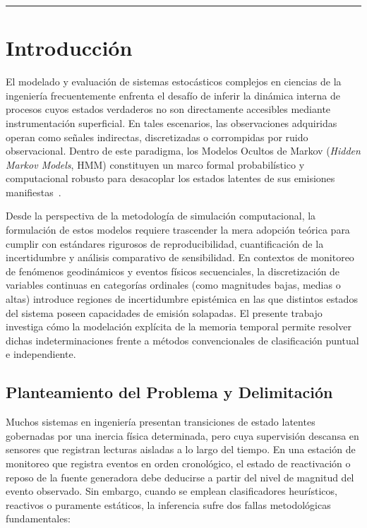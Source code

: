 \documentclass[11pt,a4paper]{article}
\begin{document}
\hrule
\vspace{0.4cm}

\section{Introducción}

El modelado y evaluación de sistemas estocásticos complejos en ciencias de la ingeniería frecuentemente enfrenta el desafío de inferir la dinámica interna de procesos cuyos estados verdaderos no son directamente accesibles mediante instrumentación superficial. En tales escenarios, las observaciones adquiridas operan como señales indirectas, discretizadas o corrompidas por ruido observacional. Dentro de este paradigma, los Modelos Ocultos de Markov (\textit{Hidden Markov Models}, HMM) constituyen un marco formal probabilístico y computacional robusto para desacoplar los estados latentes de sus emisiones manifiestas~\cite{baum1970maximization, rabiner1989tutorial}.

Desde la perspectiva de la metodología de simulación computacional, la formulación de estos modelos requiere trascender la mera adopción teórica para cumplir con estándares rigurosos de reproducibilidad, cuantificación de la incertidumbre y análisis comparativo de sensibilidad. En contextos de monitoreo de fenómenos geodinámicos y eventos físicos secuenciales, la discretización de variables continuas en categorías ordinales (como magnitudes bajas, medias o altas) introduce regiones de incertidumbre epistémica en las que distintos estados del sistema poseen capacidades de emisión solapadas. El presente trabajo investiga cómo la modelación explícita de la memoria temporal permite resolver dichas indeterminaciones frente a métodos convencionales de clasificación puntual e independiente.

\subsection{Planteamiento del Problema y Delimitación}

Muchos sistemas en ingeniería presentan transiciones de estado latentes gobernadas por una inercia física determinada, pero cuya supervisión descansa en sensores que registran lecturas aisladas a lo largo del tiempo. En una estación de monitoreo que registra eventos en orden cronológico, el estado de reactivación o reposo de la fuente generadora debe deducirse a partir del nivel de magnitud del evento observado. Sin embargo, cuando se emplean clasificadores heurísticos, reactivos o puramente estáticos, la inferencia sufre dos fallas metodológicas fundamentales:
\end{document}
